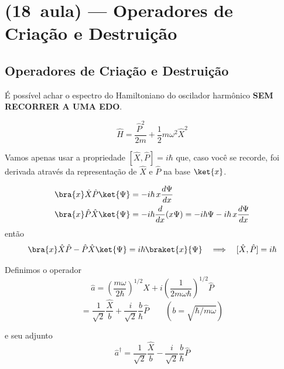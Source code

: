 \section*{(18\textordfeminine\ aula) --- Operadores de Criação e Destruição}

\subsection*{Operadores de Criação e Destruição}

É possível achar o espectro do Hamiltoniano do oscilador harmônico \textbf{SEM RECORRER A UMA EDO}.

\begin{equation}
    \hat{H} = \frac{\hat{P}^2}{2m} + \frac{1}{2}m\omega^2\hat{X}^2
\label{eq:aula18_H_osc}
\end{equation}

Vamos apenas usar a propriedade $[\hat{X}, \hat{P}] = i\hbar$ que, caso você se recorde, foi derivada através da representação de $\hat{X}$ e $\hat{P}$ na base $\ket{x}$.

\begin{align}
    \bra{x}\hat{X}\hat{P}\ket{\Psi} &= -i\hbar \, x \frac{d\Psi}{dx} \label{eq:aula18_xXP} \\
    \bra{x}\hat{P}\hat{X}\ket{\Psi} &= -i\hbar \frac{d}{dx}(x\Psi) = -i\hbar\Psi - i\hbar\, x \frac{d\Psi}{dx} \label{eq:aula18_xPX}
\end{align}
então
\begin{equation}
    \bra{x}\hat{X}\hat{P} - \hat{P}\hat{X}\ket{\Psi} = i\hbar \braket{x}{\Psi} \quad \Longrightarrow \quad [\hat{X}, \hat{P}] = i\hbar
\label{eq:aula18_comutador_XP}
\end{equation}

Definimos o operador
\begin{equation}
    \hat{a} = \left( \frac{m\omega}{2\hbar} \right)^{1/2} \hat{X} + i \left( \frac{1}{2m\omega\hbar} \right)^{1/2} \hat{P}
\label{eq:aula18_def_a}
\end{equation}
\begin{equation}
    = \frac{1}{\sqrt{2}}\frac{\hat{X}}{b} + \frac{i}{\sqrt{2}}\frac{b}{\hbar}\hat{P} \qquad \left( b = \sqrt{\hbar/m\omega} \right)
\label{eq:aula18_a_em_b}
\end{equation}

e seu adjunto
\begin{equation}
    \hat{a}^\dagger = \frac{1}{\sqrt{2}}\frac{\hat{X}}{b} - \frac{i}{\sqrt{2}}\frac{b}{\hbar}\hat{P}
\label{eq:aula18_def_adagger}
\end{equation}

